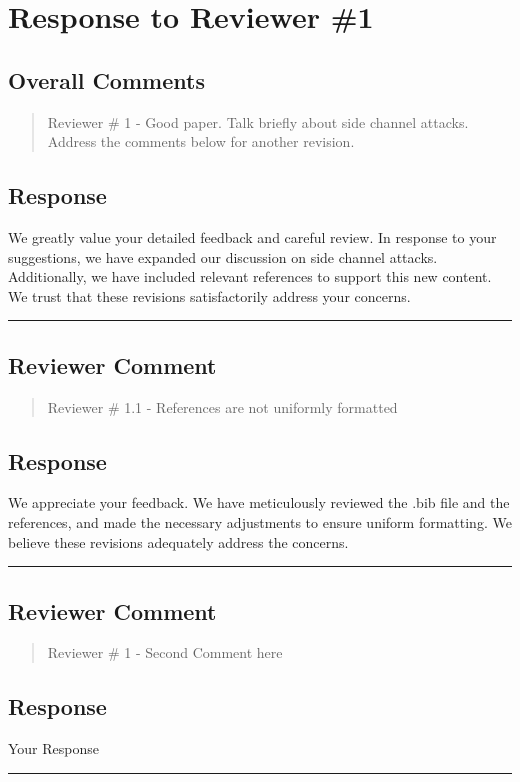 \section{Response to Reviewer \#1}
\subsection*{Overall Comments}
\begin{mdframed}
	\begin{quote}
		Reviewer \# 1 - Good paper. Talk briefly about side channel attacks. Address the comments below for another revision.
	\end{quote}
\end{mdframed}

\subsection{Response}

We greatly value your detailed feedback and careful review. In response to your suggestions, we have expanded our discussion on side channel attacks. Additionally, we have included relevant references to support this new content. We trust that these revisions satisfactorily address your concerns.


\noindent\rule{\linewidth}{2.0pt}

\subsection{Reviewer Comment}
\begin{mdframed}
	\begin{quote}
		Reviewer \# 1.1 - References are not uniformly formatted
	\end{quote}
\end{mdframed}

\subsection{Response}
We appreciate your feedback. We have meticulously reviewed the .bib file and the references, and made the necessary adjustments to ensure uniform formatting. We believe these revisions adequately address the concerns.

\noindent\rule{\linewidth}{2.0pt}



\subsection{Reviewer Comment}
\begin{mdframed}
	\begin{quote}
		Reviewer \# 1 - Second Comment here
	\end{quote}
\end{mdframed}

\subsection{Response}
Your Response




\noindent\rule{\linewidth}{6.0pt}